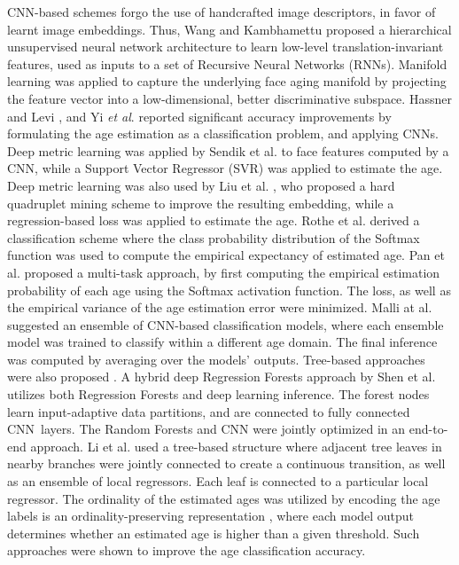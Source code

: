 \documentclass[10pt,twocolumn,letterpaper]{article}
\begin{document}
CNN-based schemes forgo the use of handcrafted image descriptors, in favor
of learnt image embeddings. Thus, Wang and Kambhamettu \cite{wang2015age}
proposed a hierarchical unsupervised neural network architecture to learn
low-level translation-invariant features, used as inputs to a set of
Recursive Neural Networks (RNNs). Manifold learning was applied to capture
the underlying face aging manifold by projecting the feature vector into a
low-dimensional, better discriminative subspace. Hassner and Levi \cite {leviage}, and Yi \emph{et al}. \cite{yi2015age} reported significant
accuracy improvements by formulating the age estimation as a classification
problem, and applying CNNs. Deep metric learning was applied by Sendik et
al. \cite{deepage} to face features computed by a CNN, while a Support
Vector Regressor (SVR) was applied to estimate the age. Deep metric learning
was also used by Liu et al. \cite{8017500}, who proposed a hard quadruplet
mining scheme to improve the resulting embedding, while a regression-based
loss was applied to estimate the age. Rothe et al. \cite{7406390} derived a
classification scheme where the class probability distribution of the
Softmax function was used to compute the empirical expectancy of estimated
age. Pan et al. \cite{Mean-Variance} proposed a multi-task approach, by
first computing the empirical estimation probability of each age using the
Softmax activation function. The  loss, as well as the empirical
variance of the age estimation error were minimized. Malli at al. \cite {Malli_2016} suggested an ensemble of CNN-based classification models, where
each ensemble model was trained to classify within a different age domain.
The final inference was computed by averaging over the models' outputs.
Tree-based approaches were also proposed \cite{8954134, 8578343}. A hybrid
deep Regression Forests approach by Shen et al. \cite{8578343} utilizes both
Regression Forests and deep learning inference. The forest nodes learn
input-adaptive data partitions, and are connected to fully connected CNN\
layers. The Random Forests and CNN were jointly optimized in an end-to-end
approach. Li et al. \cite{8954134} used a tree-based structure where
adjacent tree leaves in nearby branches were jointly connected to create a
continuous transition, as well as an ensemble of local regressors. Each leaf
is connected to a particular local regressor. The ordinality of the
estimated ages was utilized by encoding the age labels is an
ordinality-preserving representation \cite{8099569, 7780901, 9145576, coral}, where each model output determines whether an estimated age is higher than
a given threshold. Such approaches were shown to improve the age
classification accuracy.
\end{document}
